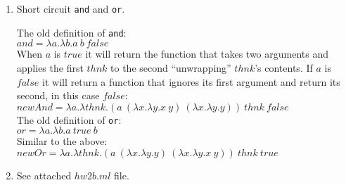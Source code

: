 \documentclass{article}
\begin{document}
\begin{description}
\begin{enumerate}
\begin{proof}
\begin{enumerate}
        \item E-Step:
            The last rule in derivation of $t\ \longrightarrow\ t$ can be 3 cases:
            \begin{enumerate}
            \item E-App1: Then we know $t$ is of form $(t1\ t2)$ and $t_1\ \longrightarrow\ t_1'$.
            \item E-App2: Then we know $t$ is of form $(v1\ t2)$ and $t_2\ \longrightarrow\ t_2'$.
            \item E-AppBeta: Then we know $t$ is of form $(t1\ v2)$.

            \verb|t|$_1$ must take a step to some \verb|t|$_1''$. By the inductive hypothesis, since we know \verb|t|$_1$ steps to both \verb|t|$_1'$ and \verb|t|$_1''$,
            then \verb|t|$_1'$ and \verb|t|$_1''$ must be the same.
            \end{enumerate}


        \item E-Trans: \verb|t|$_1$ must take a step to some \verb|t|$_1'$, and \verb|t| has the form
        \verb|if t|$_1$ \verb|then t|$_2$ \verb|else t|$_3$.


      \end{enumerate}
    \end{proof}

    \newpage

  \item Short circuit \verb|and| and \verb|or|.

    The old definition of \verb|and|:\\

    $and = \lambda a.\lambda b.a\ b\ false$\\

    When $a$ is $true$ it will return the function that takes two arguments and applies the first $thnk$ to the second ``unwrapping'' $thnk$'s contents. If $a$ is $false$ it will return a function that ignores its first argument and return its second, in this case $false$: \\

    $newAnd = \lambda a.\lambda thnk.(a\ (\lambda x.\lambda y.x\ y)\ (\lambda x.\lambda y.y))\ thnk\ false$\\

    The old definition of \verb|or|:\\

    $or = \lambda a.\lambda b.a\ true\ b$\\

    Similar to the above: \\

    $newOr = \lambda a.\lambda thnk.(a\ (\lambda x.\lambda y.y)\ (\lambda x.\lambda y.x\ y))\ thnk\ true$\\

  \item{See attached $hw2b.ml$ file.}
  \end{enumerate}

\end{description}
\end{document}
